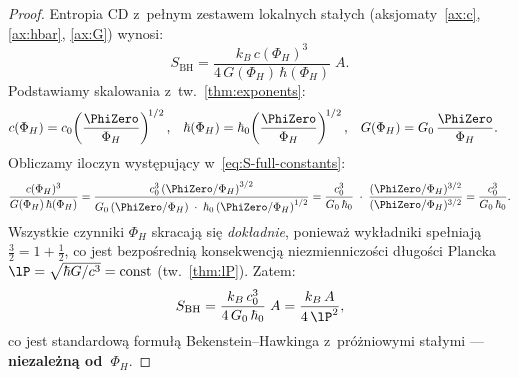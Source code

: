 \begin{proof}
Entropia CD z~pe\l{}nym zestawem lokalnych sta\l{}ych
(aksjomaty~\ref{ax:c}, \ref{ax:hbar}, \ref{ax:G}) wynosi:
\begin{equation}\label{eq:S-full-constants}
    S_{\mathrm{BH}}
    = \frac{k_B\,c(\Phi_H)^3}{4\,G(\Phi_H)\,\hbar(\Phi_H)}\;A.
\end{equation}
Podstawiamy skalowania z~tw.~\ref{thm:exponents}:
\begin{align}
    c(\Phi_H) &= c_0\!\left(\frac{\PhiZero}{\Phi_H}\right)^{\!1/2},
    &
    \hbar(\Phi_H) &= \hbar_0\!\left(\frac{\PhiZero}{\Phi_H}\right)^{\!1/2},
    &
    G(\Phi_H) &= G_0\,\frac{\PhiZero}{\Phi_H}. \notag
\end{align}
Obliczamy iloczyn wyst\k{e}puj\k{a}cy w~\eqref{eq:S-full-constants}:
\begin{equation}\label{eq:cancellation}
    \frac{c(\Phi_H)^3}{G(\Phi_H)\,\hbar(\Phi_H)}
    = \frac{c_0^3\left(\PhiZero/\Phi_H\right)^{3/2}}
           {G_0\,(\PhiZero/\Phi_H)\;\cdot\;
            \hbar_0\left(\PhiZero/\Phi_H\right)^{1/2}}
    = \frac{c_0^3}{G_0\,\hbar_0}\;\cdot\;
      \frac{(\PhiZero/\Phi_H)^{3/2}}
           {(\PhiZero/\Phi_H)^{3/2}}
    = \frac{c_0^3}{G_0\,\hbar_0}.
\end{equation}
Wszystkie czynniki $\Phi_H$ skracaj\k{a} si\k{e} \emph{dok\l{}adnie},
poniewa\.z wyk\l{}adniki spe\l{}niaj\k{a}
$\tfrac{3}{2} = 1 + \tfrac{1}{2}$, co jest bezpo\'sredni\k{a}
konsekwencj\k{a} niezmienniczo\'sci d\l{}ugo\'sci Plancka
$\lP = \sqrt{\hbar G/c^3} = \mathrm{const}$
(tw.~\ref{thm:lP}).
Zatem:
\begin{equation}\label{eq:S-BH-invariant}
    S_{\mathrm{BH}} = \frac{k_B\,c_0^3}{4\,G_0\,\hbar_0}\;A
    = \frac{k_B\,A}{4\,\lP^2},
\end{equation}
co jest standardow\k{a} formu\l{}\k{a} Bekenstein--Hawkinga
z~pr\'o\.zniowymi sta\l{}ymi --- \textbf{niezale\.zn\k{a} od~$\Phi_H$}.


\end{proof}
